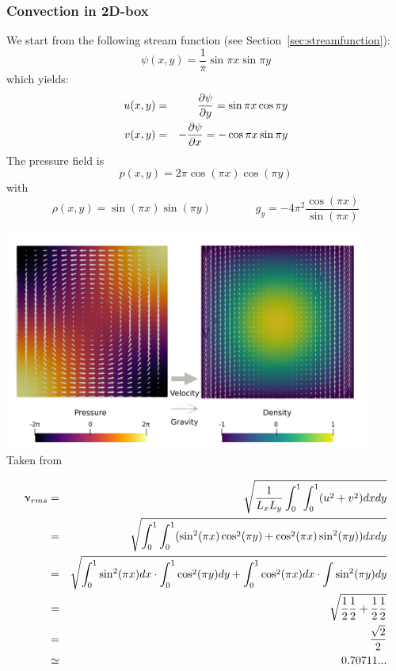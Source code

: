 \subsubsection{Convection in 2D-box} \label{sec:citb}

We start from the following stream function (see Section~\ref{sec:streamfunction}):
\begin{equation}
\psi(x,y)=\frac{1}{\pi} \sin \pi x \sin \pi y
\end{equation}
which yields:
\begin{eqnarray}
u(x,y)&=&\frac{\partial \psi}{\partial y} = \sin \pi x \cos \pi y \nonumber\\
v(x,y)&=&-\frac{\partial \psi}{\partial x} = - \cos \pi x \sin \pi y
\end{eqnarray}
The pressure field is 
\begin{equation}
p(x,y) = 2\pi \cos (\pi x) \cos (\pi y) 
\end{equation}
with 
\begin{equation}
\rho(x,y)=\sin(\pi x) \sin (\pi y)
\qquad\qquad
g_y = -4\pi ^2 \frac{\cos (\pi x)}{\sin (\pi x)}
\end{equation}

\begin{center}
\includegraphics[width=12cm]{images/benchmark_convbox/galb19}\\
{\captionfont Taken from \cite{galb19}}
\end{center}

\begin{eqnarray}
\upnu_{rms} 
&=& \sqrt{\frac{1}{L_xL_y} \int_0^1 \int_0^1 (u^2+v^2) dxdy} \nonumber\\
&=& \sqrt{\int_0^1 \int_0^1 ( \sin^2 (\pi x) \cos^2 (\pi y) + \cos^2 (\pi x) \sin^2 (\pi y) ) dxdy} \nonumber\\
&=& \sqrt{ \int_0^1 \sin^2 (\pi x) dx  \cdot \int_0^1 \cos^2 (\pi y) dy + \int_0^1 \cos^2 (\pi x) dx \cdot \int \sin^2 (\pi y) dy } \nonumber\\
&=& \sqrt{\frac{1}{2} \frac{1}{2}+ \frac{1}{2} \frac{1}{2} }\nonumber\\
&=& \frac{\sqrt{2}}{2} \nonumber\\
&\simeq& 0.70711...
\end{eqnarray}


